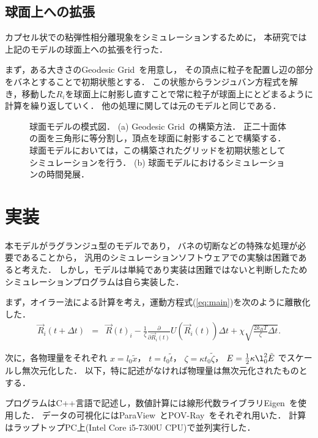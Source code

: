 \subsection{球面上への拡張}
カプセル状での粘弾性相分離現象をシミュレーションするために，
本研究では上記のモデルの球面上への拡張を行った．

まず，ある大きさのGeodesic Grid~\cite{Geodesic}を用意し，
その頂点に粒子を配置し辺の部分をバネとすることで初期状態とする．
この状態からランジュバン方程式を解き，移動した$R_i$を球面上に射影し直すことで常に粒子が球面上にとどまるように計算を繰り返していく．
他の処理に関しては元のモデルと同じである．

\begin{figure}
\centering

\caption{
    球面モデルの模式図．
    (a) Geodesic Grid~\cite{Geodesic}の構築方法．
        正二十面体の面を三角形に等分割し，頂点を球面に射影することで構築する．
        球面モデルにおいては，この構築されたグリッドを初期状態としてシミュレーションを行う．
    (b) 球面モデルにおけるシミュレーションの時間発展．
}
\label{fig:model_sphere}
\end{figure}






\section{実装}
本モデルがラグランジュ型のモデルであり，
バネの切断などの特殊な処理が必要であることから，
汎用のシミュレーションソフトウェアでの実験は困難であると考えた．
しかし，モデルは単純であり実装は困難ではないと判断したためシミュレーションプログラムは自ら実装した．

まず，オイラー法による計算を考え，運動方程式(\ref{eq:main})を次のように離散化した．
\begin{eqnarray}
    \vec{R}_i(t+\Delta t) &=& 
    \vec{R}(t)_i
    -\frac{1}{\zeta}\frac{\partial}{\partial\vec{R}_i(t)}U(\vec{R}_i(t))\Delta t
    +\chi\sqrt{\frac{2k_B T}{\zeta}\Delta t}
    .
\end{eqnarray}

次に，各物理量をそれぞれ
$x=l_0 \tilde{x}$，
$t=t_0 \tilde{t}$，
$\zeta=\kappa t_0 \tilde{\zeta}$，
$E=\frac{1}{2}\kappa\l_0^2\tilde{E}$
でスケールし無次元化した．
以下，特に記述がなければ物理量は無次元化されたものとする．


プログラムはC++言語で記述し，数値計算には線形代数ライブラリEigen~\cite{eigenweb}を使用した．
データの可視化にはParaView~\cite{paraview}とPOV-Ray~\cite{povray}をそれぞれ用いた．
計算はラップトップPC上(Intel Core i5-7300U CPU)で並列実行した．



